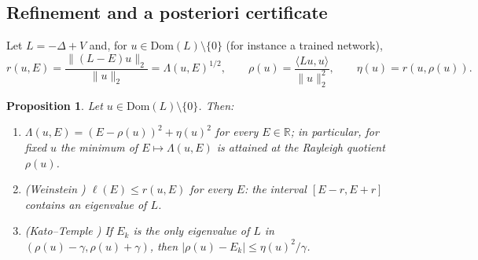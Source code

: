 \documentclass[10pt]{amsart}
\newenvironment{revblock}{\color{blue}}{}
\theoremstyle{definition}
\theoremstyle{remark}
\theoremstyle{plain}
\newtheorem{proposition}[theorem]{Proposition}
\newcommand{\R}{\mathbb{R}}
\begin{document}
\subsection{Refinement and a posteriori certificate}\label{sec.certificate}
\begin{revblock}
Let $L=-\Delta+V$ and, for $u\in \mathrm{Dom}(L)\setminus\{0\}$ (for instance a trained network),
\[
r(u,E)=\frac{\|(L-E)u\|_2}{\|u\|_2}=\Lambda(u,E)^{1/2},\qquad
\rho(u)=\frac{\langle Lu,u\rangle}{\|u\|_2^2},\qquad \eta(u)=r(u,\rho(u)).
\]

\begin{proposition}\label{prop.rayleigh}
Let $u\in \mathrm{Dom}(L)\setminus\{0\}$. Then:
\begin{enumerate}
\item[(a)] $\Lambda(u,E)=(E-\rho(u))^2+\eta(u)^2$ for every $E\in\R$; in particular, for fixed $u$ the
minimum of $E\mapsto\Lambda(u,E)$ is attained at the Rayleigh quotient $\rho(u)$.
\item[(b)] (Weinstein \cite{Weinstein1934,Parlett1998}) $\ell(E)\le r(u,E)$ for every $E$: the interval
$[E-r,E+r]$ contains an eigenvalue of $L$.
\item[(c)] (Kato--Temple \cite{Kato1949,Parlett1998}) If $E_k$ is the only eigenvalue of $L$ in
$(\rho(u)-\gamma,\rho(u)+\gamma)$, then $|\rho(u)-E_k|\le\eta(u)^2/\gamma$.
\end{enumerate}
\end{proposition}


\end{revblock}
\end{document}
